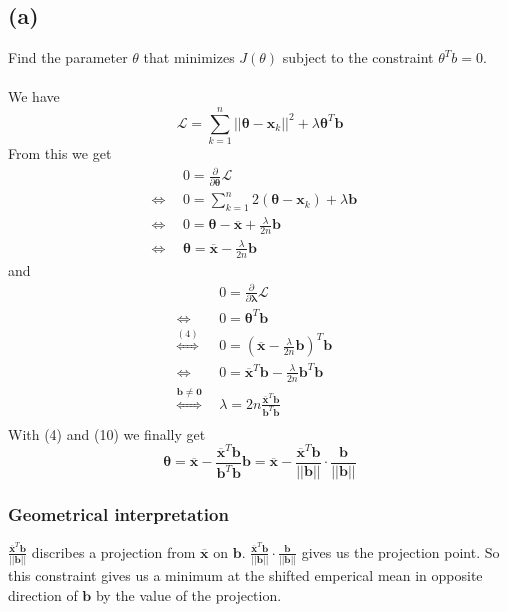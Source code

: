\documentclass{article}
\newcommand{\PartDiv}[1]{\frac{\partial}{\partial #1}}
\begin{document}
\subsection*{(a)}
Find the parameter $\theta$ that minimizes $J(\theta)$ subject to the constraint $\theta^T b = 0$.\\ \\
We have
$$
\mathcal{L} = \sum \limits _{k=1}^n ||\boldsymbol{\theta} - \boldsymbol{x}_k||^2 + \lambda \boldsymbol{\theta}^T\boldsymbol{b}
$$
From this we get
\begin{align}
&0 = \PartDiv{\boldsymbol{\theta}} \mathcal{L}&\\
\Leftrightarrow~~&0 = \sum \limits _{k=1}^n 2(\boldsymbol{\theta} - \boldsymbol{x}_k) + \lambda \boldsymbol{b}&\\ 
\Leftrightarrow~~&0= \boldsymbol{\theta} - \overline{\boldsymbol{x}} + \frac{\lambda}{2n} \boldsymbol{b}&\\
\Leftrightarrow~~&\boldsymbol{\theta} = \overline{\boldsymbol{x}} - \frac{\lambda}{2n} \boldsymbol{b}&
\end{align}
and
\begin{align}
&0 = \PartDiv{\boldsymbol{\lambda}} \mathcal{L}&\\
\Leftrightarrow~~&0 =  \boldsymbol{\theta}^T \boldsymbol{b}&\\ 
\stackrel{(4)}{\Leftrightarrow}~~&0= (\overline{\boldsymbol{x}} - \frac{\lambda}{2n} \boldsymbol{b})^T \boldsymbol{b}&\\
\Leftrightarrow~~&0= \overline{\boldsymbol{x}}^T\boldsymbol{b} - \frac{\lambda}{2n} \boldsymbol{b}^T \boldsymbol{b}&\\
\stackrel{\boldsymbol{b} \neq \boldsymbol{0}}{\Leftrightarrow}~~&\lambda = 2n \frac {\overline{\boldsymbol{x}}^T\boldsymbol{b}}{\boldsymbol{b}^T \boldsymbol{b}}&\\
\end{align}
With (4) and (10) we finally get
$$
\boldsymbol{\theta} = \overline{\boldsymbol{x}} - \frac {\overline{\boldsymbol{x}}^T\boldsymbol{b}}{\boldsymbol{b}^T \boldsymbol{b}} \boldsymbol{b} 
=\overline{\boldsymbol{x}} - \frac {\overline{\boldsymbol{x}}^T\boldsymbol{b}}{||\boldsymbol{b}||} \cdot \frac{\boldsymbol{b}}{||\boldsymbol{b}||}  
$$
\subsubsection*{Geometrical interpretation}
$\frac {\overline{\boldsymbol{x}}^T\boldsymbol{b}}{||\boldsymbol{b}||}$ discribes a projection from $\boldsymbol{\overline{x}}$ on $\boldsymbol{b}$.
$\frac {\overline{\boldsymbol{x}}^T\boldsymbol{b}}{||\boldsymbol{b}||}\cdot \frac{\boldsymbol{b}}{||\boldsymbol{b}||}$ gives us the projection point. 
So this constraint gives us a minimum at the shifted emperical mean in opposite direction of $\boldsymbol{b}$ by the value of the projection.
\end{document}

